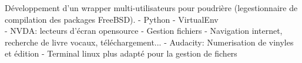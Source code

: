 \documentclass[
	a4paper,
]{FortySecondsCV/fortysecondscv}
\begin{document}
\newpage
\makebacksidebar

\begin{cvtable}
	{
		Développement d’un wrapper multi-utilisateurs pour poudrière (legestionnaire de compilation des packages FreeBSD).
			\tabto{2mm}- Python
			\tabto{2mm}- VirtualEnv
			\\
	}
	{
		\tabto{2mm}- NVDA: lecteurs d'écran opensource
		\tabto{2mm}- Gestion fichiers
		\tabto{2mm}- Navigation internet, recherche de livre vocaux, téléchargement...
		\tabto{2mm}- Audacity: Numerisation de vinyles et édition
		\tabto{2mm}- Terminal linux plus adapté pour la gestion de fichers 
	}
\end{cvtable}

\cvsignature
\end{document}
